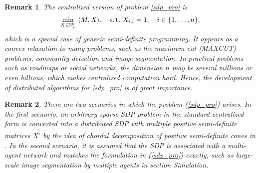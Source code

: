 \documentclass[journal]{IEEEtran}
\newtheorem{remark}{Remark}[section]
\newcommand{\upcite}[1]{\textsuperscript{\textsuperscript{\cite{#1}}}}
\begin{document}
\begin{remark}
	The centralized version of problem \eqref{sdp_pro} is 
	\begin{align}\label{cen-sdp}
	\min_{X\in\mathbb{S}_{+}^n} \,\, \langle M, X\rangle,
	\quad {\rm s. \, t.}\, \,  X_{i,i}=1,\quad i\in\{1,\ldots,n\},
	\end{align}
	which is a special case of generic semi-definite programming. It appears as a convex relaxation to many problems, such as the maximum cut (MAXCUT) problems\upcite{1995Improved}, community detection\upcite{2016community} and image segmentation\upcite{mincut_graph}. In practical problems such as roadmaps or social networks, the dimension $n$ may be several millions or even billions, which makes centralized computation hard. Hence, the development of distributed algorithms for \eqref{sdp_pro} is of great importance. 
\end{remark}

\begin{remark} 
	There are two scenarios in which the problem (\ref{sdp_pro}) arises. In the first scenario, an arbitrary sparse SDP problem in the standard centralized form is converted into a distributed SDP with multiple positive semi-definite matrices $X^{\tilde{i}}$ by the idea of chordal decomposition of positive semi-definite cones in \cite{chor_spar}. In the second scenario, it is assumed that the SDP is associated with a multi-agent network and matches the formulation in (\ref{sdp_pro}) exactly, such as large-scale image segmentation by multiple agents in section Simulation.
\end{remark}
\end{document}
